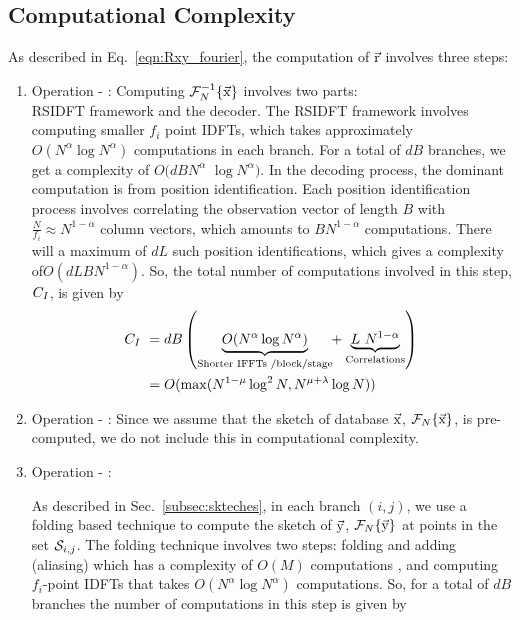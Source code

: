 \subsection{\bf Computational Complexity}
As described in Eq.~\ref{eqn:Rxy_fourier}, the computation of $\vec{\mathrm{r}}$ involves three steps:
\begin{enumerate} 
	\item  Operation - :
	 Computing $\mathcal{F}_{N}^{-1}\{ \vec{\mathrm{x}} \}$ involves two parts:\\ RSIDFT framework and the decoder. The RSIDFT framework involves computing smaller $f_i$ point IDFTs, which takes approximately $O(N^{\alpha} \log N^{\alpha})$ computations in each branch. For a total of $dB$ branches, we get a complexity of $O(dB N^{\alpha}$ $\log N^{\alpha})$. In the decoding process, the dominant computation is from position identification. Each position identification process involves correlating the observation vector of length $B$ with $\frac{N}{f_i} \approx N^{1-\alpha}$ column vectors, which amounts to $B N^{1-\alpha}$ computations. There will a maximum of $dL$ such position identifications, which gives a complexity of$O(dLBN^{1-\alpha} )$.   So, the total number of computations involved in this step, $C_{\RNum{1}}$, is given by
	\begin{align*}
	C_{\RNum{1}} \ &=  {d B}  \left (
	\underset{\text{Shorter IFFTs /block/stage} }{\underbrace{ O(N^{\alpha}  \log N^{\alpha})}} \hspace{-3pt}+ \underset{\text{Correlations} }{\underbrace{ L~N^{1-\alpha}}} \right )\\ 
	&=  O(\max(N^{1-\mu}\log^2 N ,N^{\mu+\lambda}\log N)) 
		\end{align*}
	
	\item  Operation - :
	Since we assume that the sketch of database $\vec{\mathrm{x}}$, $\mathcal{F}_{N}\{\vec{\mathrm{x}}\}$, is pre-computed, we do not include this in computational complexity.
	
	\item  Operation - :
	
	As described in Sec.~\ref{subsec:skteches}, in each branch $(i,j)$, we use a folding based technique to compute the sketch of $\vec{\mathrm{y}}$, $\mathcal{F}_{N}\{\vec{\mathrm{y}}\}$ at points in the set $\mathcal{S}_{i,j}$. The folding technique involves two steps: folding and adding (aliasing) which has a complexity of $O(M)$ computations , and computing $f_i$-point IDFTs that takes $O(N^\alpha \log N^{\alpha})$ computations. So, for a total of $dB$ branches the number of computations in this step is given by
	

\end{enumerate}

